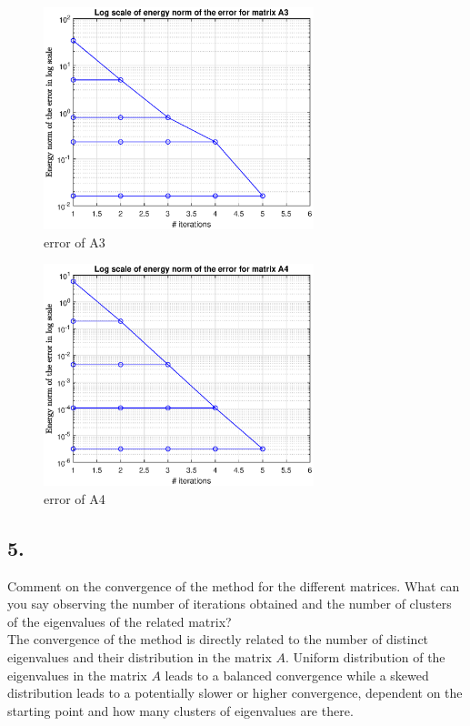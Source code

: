 \documentclass[unicode,11pt,a4paper,oneside,numbers=endperiod,openany]{scrartcl}
\begin{document}
\begin{figure}[htbp]
\centering
\caption{error of A3}
\includegraphics[width=0.7\textwidth, trim={0cm 0cm 0cm 0cm}]{./figures/ex3-a3.eps}
\end{figure}

\begin{figure}[htbp]
\centering
\caption{error of A4}
\includegraphics[width=0.7\textwidth, trim={0cm 0cm 0cm 0cm}]{./figures/ex3-a4.eps}
\end{figure}


\subsection*{5.}
Comment on the convergence of the method for the different matrices.
What can you say observing the number of iterations obtained
and the number of clusters of the eigenvalues of the related matrix?\\

The convergence of the method is directly related to the number of distinct eigenvalues
and their distribution in the matrix $A$.
Uniform distribution of the eigenvalues in the matrix $A$ leads to a balanced convergence
while a skewed distribution leads to a potentially slower or higher convergence,
dependent on the starting point and how many clusters of eigenvalues are there.
\end{document}
